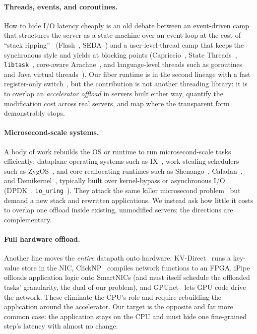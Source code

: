 \paragraph{Threads, events, and coroutines.}
How to hide I/O latency cheaply is an old debate between an event-driven camp that structures the server
as a state machine over an event loop at the cost of ``stack ripping''~\citep{adya}
(Flash~\citep{flash}, SEDA~\citep{seda}) and a user-level-thread camp that keeps the synchronous
style and yields at blocking points (Capriccio~\citep{capriccio}, State
Threads~\citep{statethreads}, \texttt{libtask}~\citep{libtask}, core-aware
Arachne~\citep{arachne}, and language-level threads such as goroutines~\citep{golang} and Java
virtual threads~\citep{loom}). Our fiber runtime is in the second lineage with a fast
register-only switch~\citep{fastwake}, but the contribution is not another threading library: it
is to overlap an \emph{accelerator offload} in servers built either way, quantify the modification
cost across real servers, and map where the transparent form demonstrably stops.

\paragraph{Microsecond-scale systems.}
A body of work rebuilds the OS or runtime to run microsecond-scale tasks efficiently: dataplane
operating systems such as IX~\citep{ix}, work-stealing schedulers such as ZygOS~\citep{zygos}, and
core-reallocating runtimes such as Shenango~\citep{shenango}, Caladan~\citep{caladan}, and
Demikernel~\citep{demikernel}, typically built over kernel-bypass or asynchronous I/O
(DPDK~\citep{dpdk}, \texttt{io\_uring}~\citep{iouring}). They attack the same killer microsecond
problem~\citep{microsecond} but demand a new stack and rewritten applications. We instead ask how
little it costs to overlap one offload inside existing, unmodified servers; the directions are
complementary.

\paragraph{Full hardware offload.}
Another line moves the \emph{entire} datapath onto hardware: KV-Direct~\citep{kvdirect} runs a
key-value store in the NIC, ClickNP~\citep{clicknp} compiles network functions to an FPGA,
iPipe~\citep{ipipe} offloads application logic onto SmartNICs (and must itself schedule the
offloaded tasks' granularity, the dual of our problem), and GPUnet~\citep{gpunet} lets GPU code
drive the network. These eliminate the CPU's role and require rebuilding the application around
the accelerator. Our target is the opposite and far more common case: the application stays on the
CPU and must hide one fine-grained step's latency with almost no change.

